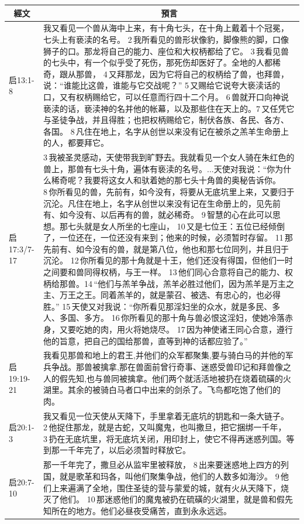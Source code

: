 \begin{table}[H]
\centering
\begin{tabular}{p{}|p{}}\hline\hline
  \multicolumn{1}{c|}{經文}&\multicolumn{1}{c}{預言}\\\hline

启13:1-8&我又看见一个兽从海中上来，有十角七头，在十角上戴着十个冠冕，七头上有亵渎的名号。 2 我所看见的兽形状像豹，脚像熊的脚，口像狮子的口。那龙将自己的能力、座位和大权柄都给了它。 3 我看见兽的七头中，有一个似乎受了死伤，那死伤却医好了。全地的人都稀奇，跟从那兽， 4 又拜那龙，因为它将自己的权柄给了兽，也拜兽，说：“谁能比这兽，谁能与它交战呢？” 5 又赐给它说夸大亵渎话的口，又有权柄赐给它，可以任意而行四十二个月。 6 兽就开口向神说亵渎的话，亵渎神的名并他的帐幕，以及那些住在天上的。7 又任凭它与圣徒争战，并且得胜；也把权柄赐给它，制伏各族、各民、各方、各国。 8 凡住在地上，名字从创世以来没有记在被杀之羔羊生命册上的人，都要拜它。\\\hline

启17:3/7-17&3 我被圣灵感动，天使带我到旷野去。我就看见一个女人骑在朱红色的兽上，那兽有七头十角，遍体有亵渎的名号。...天使对我说：“你为什么稀奇呢？我要将这女人和驮着她的那七头十角兽的奥秘告诉你。 8 你所看见的兽，先前有，如今没有，将要从无底坑里上来，又要归于沉沦。凡住在地上，名字从创世以来没有记在生命册上的，见先前有、如今没有、以后再有的兽，就必稀奇。 9 智慧的心在此可以思想。那七头就是女人所坐的七座山， 10 又是七位王：五位已经倾倒了，一位还在，一位还没有来到；他来的时候，必须暂时存留。 11 那先前有、如今没有的兽，就是第八位，他也和那七位同列，并且归于沉沦。 12 你所看见的那十角就是十王，他们还没有得国，但他们一时之间要和兽同得权柄，与王一样。 13 他们同心合意将自己的能力、权柄给那兽。14 “他们与羔羊争战，羔羊必胜过他们，因为羔羊是万主之主、万王之王。同着羔羊的，就是蒙召、被选、有忠心的，也必得胜。” 15 天使又对我说：“你所看见那淫妇坐的众水，就是多民、多人、多国、多方。 16 你所看见的那十角与兽必恨这淫妇，使她冷落赤身，又要吃她的肉，用火将她烧尽。 17 因为神使诸王同心合意，遵行他的旨意，把自己的国给那兽，直等到神的话都应验了。” \\\hline

启19:19-21&我看见那兽和地上的君王,并他们的众军都聚集,要与骑白马的并他的军兵争战。那兽被擒拿,那在兽面前曾行奇事、迷惑受兽印记和拜兽像之人的假先知,也与兽同被擒拿。他们两个就活活地被扔在烧着硫磺的火湖里。其余的被骑白马者口中出来的剑杀了。飞鸟都吃饱了他们的肉。 \\\hline

启20:1-3&我又看见一位天使从天降下，手里拿着无底坑的钥匙和一条大链子。 2 他捉住那龙，就是古蛇，又叫魔鬼，也叫撒旦，把它捆绑一千年， 3 扔在无底坑里，将无底坑关闭，用印封上，使它不得再迷惑列国。等到那一千年完了，以后必须暂时释放它。 \\\hline

启20:7-10&那一千年完了，撒旦必从监牢里被释放， 8 出来要迷惑地上四方的列国，就是歌革和玛各，叫他们聚集争战，他们的人数多如海沙。 9 他们上来遍满了全地，围住圣徒的营与蒙爱的城，就有火从天降下，烧灭了他们。 10 那迷惑他们的魔鬼被扔在硫磺的火湖里，就是兽和假先知所在的地方。他们必昼夜受痛苦，直到永永远远。 \\\hline

\end{tabular}
\end{table}



